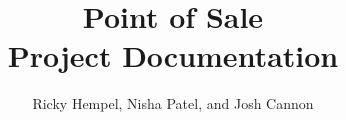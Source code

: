 \documentclass[10pt,conference,onecolumn,compsoc]{IEEEtran}
\begin{document}
%
\title{ Point of Sale \\ Project Documentation}
%
%
%
%

\author{Ricky Hempel, Nisha Patel, and Josh Cannon\\%
}

% 
%
\end{document}
